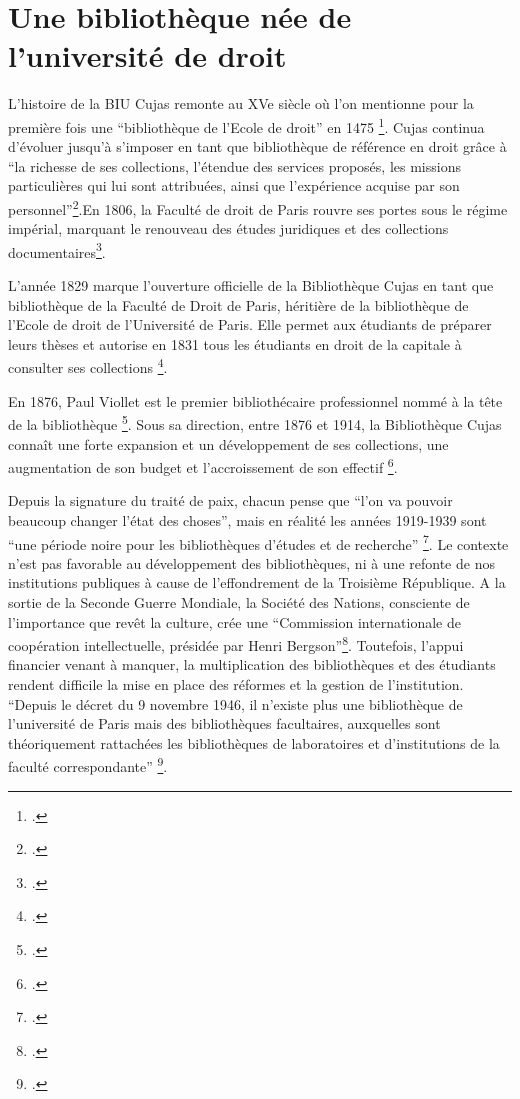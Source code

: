 \section[Naissance de la bibliothèque]{Une bibliothèque née de l'université de droit}
L'histoire de la \ac{BIU Cujas} remonte au XVe siècle où l'on mentionne pour la première fois une  \enquote{bibliothèque de l'Ecole de droit} en 1475 \footcite{lobetCujasTraditionModernite2002}. Cujas continua d'évoluer jusqu'à s'imposer en tant que bibliothèque de référence en droit grâce à \enquote{la richesse de ses collections, l'étendue des services proposés, les missions particulières qui lui sont attribuées, ainsi que l'expérience acquise par son personnel}\footcite{BibliothequeInteruniversitaireCujas}.En 1806, la Faculté de droit de Paris rouvre ses portes sous le régime impérial, marquant le renouveau des études juridiques et des collections documentaires\footcite{zotero-item-511}.

L'année 1829 marque l'ouverture officielle de la Bibliothèque Cujas en tant que bibliothèque de la Faculté de Droit de Paris, héritière de la bibliothèque de l'Ecole de droit de l'Université de Paris. Elle permet aux étudiants de préparer leurs thèses et autorise en 1831 tous les étudiants en droit de la capitale à consulter ses collections \footcite{BibliothequeInteruniversitaireCujas}. 

En 1876, Paul Viollet est le premier bibliothécaire professionnel nommé à la tête de la bibliothèque \footcite{BibliothequeFaculteDroit2018}. Sous sa direction, entre 1876 et 1914, la Bibliothèque Cujas connaît une forte expansion et un développement de ses collections, une augmentation de son budget et l'accroissement de son effectif \footcite{BibliothequeFaculteDroit2018}.   

Depuis la signature du traité de paix, chacun pense que \enquote{l'on va pouvoir beaucoup changer l'état des choses}, mais en réalité les années 1919-1939 sont \enquote{une période noire pour les bibliothèques d'études et de recherche} \footcite{poulainHistoireBibliothequesFrancaises1992}. Le contexte n'est pas favorable au développement des bibliothèques, ni à une refonte de nos institutions publiques à cause de l'effondrement de la Troisième République. A la sortie de la Seconde Guerre Mondiale, la Société des Nations, consciente de l'importance que revêt la culture, crée une \enquote{Commission internationale de coopération intellectuelle, présidée par Henri Bergson}\footcite{poulainHistoireBibliothequesFrancaises1992}. Toutefois, l'appui financier venant à manquer, la multiplication des bibliothèques et des étudiants rendent difficile la mise en place des réformes et la gestion de l'institution. \enquote{Depuis le décret du 9 novembre 1946, il n'existe plus une bibliothèque de l'université de Paris mais des bibliothèques facultaires, auxquelles sont théoriquement rattachées les bibliothèques de laboratoires et d'institutions de la faculté correspondante} \footcite{poulainHistoireBibliothequesFrancaises1992}.


